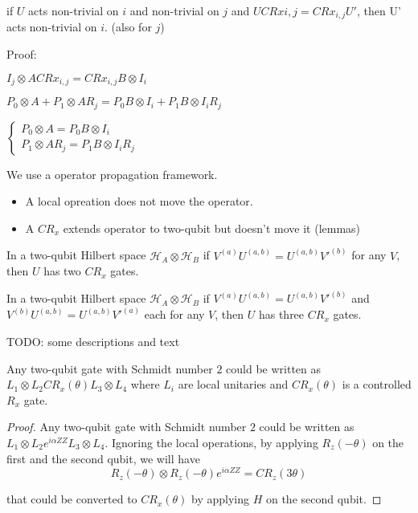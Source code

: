 if $U$ acts non-trivial on $i$ and non-trivial on $j$ and $U CRx{i,j} = CRx_{i,j} U'$, then U' acts non-trivial on $i$. (also for $j$)

Proof:

$I_j \otimes A CRx_{i,j} = CRx_{i,j} B \otimes I_i$

$P_0 \otimes A + P_1 \otimes A R_j = P_0 B \otimes I_i + P_1 B \otimes I_i R_j$

$\begin{cases} P_0 \otimes A = P_0 B \otimes I_i \\
P_1 \otimes A R_j = P_1 B \otimes I_i R_j
\end{cases}$




We use a operator propagation framework.

\begin{itemize}
  \item A local opreation does not move the operator.
  \item A $CR_x$ extends operator to two-qubit but doesn't move it (lemmas)
\end{itemize}

\begin{lemma}
  In a two-qubit Hilbert space $\mathcal{H}_A \otimes \mathcal{H}_B$ if $V^{(a)} U^{(a,b)} = U^{(a,b)} V'^{(b)}$ for any $V$, then $U$ has two $CR_x$ gates.
\end{lemma}

\begin{lemma}
  In a two-qubit Hilbert space $\mathcal{H}_A \otimes \mathcal{H}_B$ if $V^{(a)} U^{(a,b)} = U^{(a,b)} V'^{(b)}$ and $V^{(b)} U^{(a,b)} = U^{(a,b)} V'^{(a)}$ each for any $V$, then $U$ has three $CR_x$ gates.
\end{lemma}



TODO: some descriptions and text 

\begin{lemma}
  Any two-qubit gate with Schmidt number $2$ could be written as $L_1 \otimes L_2 CR_x(\theta) L_3 \otimes L_4$ where $L_i$ are local unitaries and $CR_x(\theta)$ is a controlled $R_x$ gate.
  \label{lem:decomposition-schmidt-2}
\end{lemma}
\begin{proof}
  Any two-qubit gate with Schmidt number $2$ could be written as $L_1 \otimes L_2 e^{i\alpha ZZ} L_3 \otimes L_4$. 
  Ignoring the local operations, by applying $R_z(-\theta)$ on the first and the second qubit, we will have 
  \begin{equation}
    R_z(-\theta) \otimes R_z(-\theta) e^{i\alpha ZZ} = CR_z(3\theta)
  \end{equation}
  
  that could be converted to $CR_x(\theta)$ by applying $H$ on the second qubit.
\end{proof}

